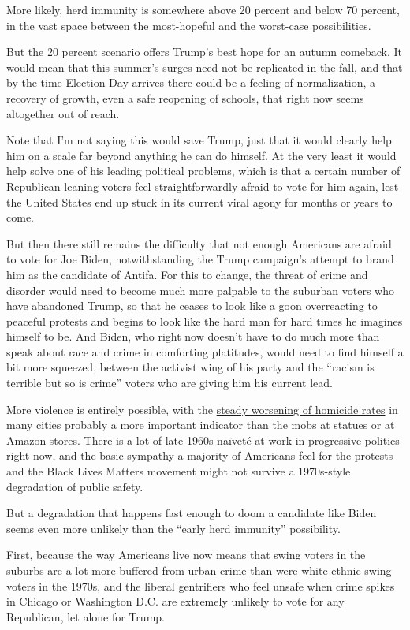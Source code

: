 More likely, herd immunity is somewhere above 20 percent and below 70
percent, in the vast space between the most-hopeful and the worst-case
possibilities.

But the 20 percent scenario offers Trump's best hope for an autumn
comeback. It would mean that this summer's surges need not be replicated
in the fall, and that by the time Election Day arrives there could be a
feeling of normalization, a recovery of growth, even a safe reopening of
schools, that right now seems altogether out of reach.

Note that I'm not saying this would save Trump, just that it would
clearly help him on a scale far beyond anything he can do himself. At
the very least it would help solve one of his leading political
problems, which is that a certain number of Republican-leaning voters
feel straightforwardly afraid to vote for him again, lest the United
States end up stuck in its current viral agony for months or years to
come.

But then there still remains the difficulty that not enough Americans
are afraid to vote for Joe Biden, notwithstanding the Trump campaign's
attempt to brand him as the candidate of Antifa. For this to change, the
threat of crime and disorder would need to become much more palpable to
the suburban voters who have abandoned Trump, so that he ceases to look
like a goon overreacting to peaceful protests and begins to look like
the hard man for hard times he imagines himself to be. And Biden, who
right now doesn't have to do much more than speak about race and crime
in comforting platitudes, would need to find himself a bit more
squeezed, between the activist wing of his party and the ``racism is
terrible but so is crime'' voters who are giving him his current lead.

More violence is entirely possible, with the
\href{https://www.nytimes.com/2020/07/06/upshot/murders-rising-crime-coronavirus.html}{steady
worsening of homicide rates} in many cities probably a more important
indicator than the mobs at statues or at Amazon stores. There is a lot
of late-1960s naïveté at work in progressive politics right now, and the
basic sympathy a majority of Americans feel for the protests and the
Black Lives Matters movement might not survive a 1970s-style degradation
of public safety.

But a degradation that happens fast enough to doom a candidate like
Biden seems even more unlikely than the ``early herd immunity''
possibility.

First, because the way Americans live now means that swing voters in the
suburbs are a lot more buffered from urban crime than were white-ethnic
swing voters in the 1970s, and the liberal gentrifiers who feel unsafe
when crime spikes in Chicago or Washington D.C. are extremely unlikely
to vote for any Republican, let alone for Trump.


